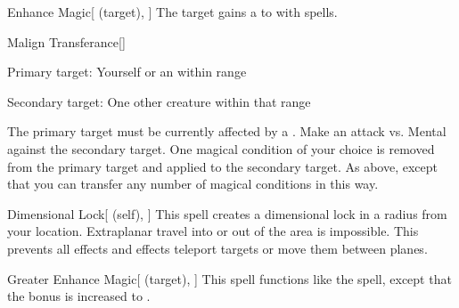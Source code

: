 \lowercase{\hypertarget{spell:Enhance Magic}{}}\label{spell:Enhance Magic}
\begin{attuneability}[Rank 3]{\hypertarget{spell:Enhance Magic}{Enhance Magic}}[ (target), ]
The target gains a   to  with spells.
\end{attuneability}
\vspace{0.25em}



\lowercase{\hypertarget{spell:Malign Transferance}{}}\label{spell:Malign Transferance}
\begin{freeability}[Rank 3]{\hypertarget{spell:Malign Transferance}{Malign Transferance}}[]

Primary target: Yourself or an  within \rngmed range
\par\noindent
Secondary target: One other creature within that range

The primary target must be currently affected by a  .
Make an attack vs. Mental against the secondary target.
\hit One magical condition of your choice is removed from the primary target and applied to the secondary target.
\crit As above, except that you can transfer any number of magical conditions in this way.
\end{freeability}
\vspace{0.25em}



\lowercase{\hypertarget{spell:Dimensional Lock}{}}\label{spell:Dimensional Lock}
\begin{attuneability}[Rank 5]{\hypertarget{spell:Dimensional Lock}{Dimensional Lock}}[ (self), ]
\targetrule
This spell creates a dimensional lock in a \arealarge radius  from your location.
Extraplanar travel into or out of the area is impossible.
This prevents all  effects and effects teleport targets or move them between planes.
\end{attuneability}
\vspace{0.25em}



\lowercase{\hypertarget{spell:Greater Enhance Magic}{}}\label{spell:Greater Enhance Magic}
\begin{attuneability}[Rank 6]{\hypertarget{spell:Greater Enhance Magic}{Greater Enhance Magic}}[ (target), ]
This spell functions like the  spell, except that the bonus is increased to .
\end{attuneability}
\vspace{0.25em}



